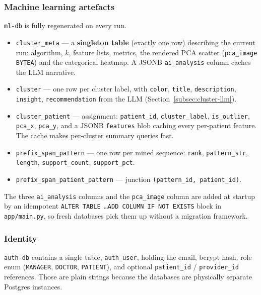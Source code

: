 \subsubsection*{Machine learning artefacts}

\texttt{ml-db} is fully regenerated on every run.
\begin{itemize}
    \item \texttt{cluster\_meta} --- a \textbf{singleton table} (exactly one row) describing the current run: algorithm, $k$, feature lists, metrics, the rendered PCA scatter (\texttt{pca\_image BYTEA}) and the categorical heatmap. A JSONB \texttt{ai\_analysis} column caches the LLM narrative.
    \item \texttt{cluster} --- one row per cluster label, with \texttt{color}, \texttt{title}, \texttt{description}, \texttt{insight}, \texttt{recommendation} from the LLM (Section~\ref{subsec:cluster-llm}).
    \item \texttt{cluster\_patient} --- assignment: \texttt{patient\_id}, \texttt{cluster\_label}, \texttt{is\_outlier}, \texttt{pca\_x}, \texttt{pca\_y}, and a JSONB \texttt{features} blob caching every per-patient feature. The cache makes per-cluster summary queries fast.
    \item \texttt{prefix\_span\_pattern} --- one row per mined sequence: \texttt{rank}, \texttt{pattern\_str}, \texttt{length}, \texttt{support\_count}, \texttt{support\_pct}.
    \item \texttt{prefix\_span\_patient\_pattern} --- junction \texttt{(pattern\_id, patient\_id)}.
\end{itemize}

The three \texttt{ai\_analysis} columns and the \texttt{pca\_image} column are added at startup by an idempotent \texttt{ALTER TABLE \ldots ADD COLUMN IF NOT EXISTS} block in \texttt{app/main.py}, so fresh databases pick them up without a migration framework.

\subsubsection*{Identity}

\texttt{auth-db} contains a single table, \texttt{auth\_user}, holding the email, bcrypt hash, role enum (\texttt{MANAGER}, \texttt{DOCTOR}, \texttt{PATIENT}), and optional \texttt{patient\_id} / \texttt{provider\_id} references. Those are plain strings because the databases are physically separate Postgres instances.
